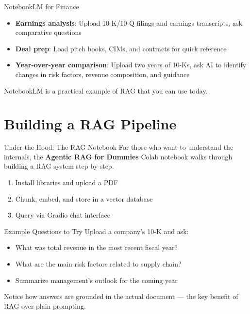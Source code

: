 \documentclass[aspectratio=169]{beamer}
\begin{document}
\begin{frame}{NotebookLM for Finance}
\begin{itemize}
  \item \textbf{Earnings analysis}: Upload 10-K/10-Q filings and earnings transcripts, ask comparative questions
  \item \textbf{Deal prep}: Load pitch books, CIMs, and contracts for quick reference
  \item \textbf{Year-over-year comparison}: Upload two years of 10-Ks, ask AI to identify changes in risk factors, revenue composition, and guidance
\end{itemize}
\vspace{0.3cm}
NotebookLM is a practical example of RAG that you can use \alert{today}.
\end{frame}

\section{Building a RAG Pipeline}

\begin{frame}{Under the Hood: The RAG Notebook}
For those who want to understand the internals, the \textbf{Agentic RAG for Dummies} Colab notebook walks through building a RAG system step by step.
\vspace{0.3cm}
\begin{enumerate}
  \item Install libraries and upload a PDF
  \item Chunk, embed, and store in a vector database
  \item Query via Gradio chat interface
\end{enumerate}
\end{frame}

\begin{frame}{Example Questions to Try}
Upload a company's 10-K and ask:
\vspace{0.3cm}
\begin{itemize}
  \item What was total revenue in the most recent fiscal year?
  \item What are the main risk factors related to supply chain?
  \item Summarize management's outlook for the coming year
\end{itemize}
\vspace{0.3cm}
Notice how answers are grounded in the actual document --- the key benefit of RAG over plain prompting.
\end{frame}
\end{document}
